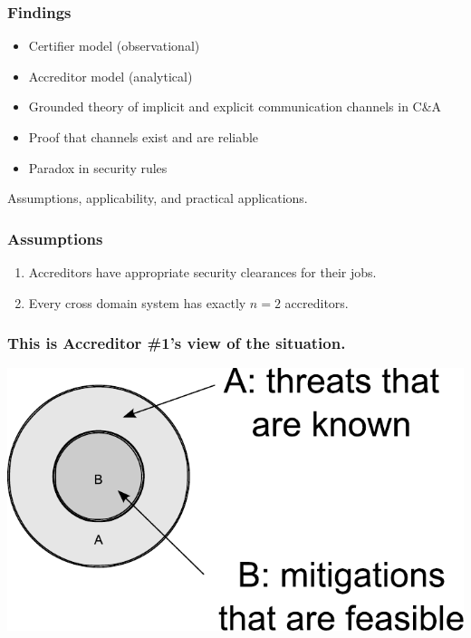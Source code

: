 \documentclass{beamer}
\begin{document}

\begin{frame}
	\frametitle{Findings}
	\begin{itemize}
		\item Certifier model (observational)
		\item Accreditor model (analytical)
		\item Grounded theory of implicit and explicit communication channels in C\&A
		\item Proof that channels exist and are reliable
		\item Paradox in security rules
	\end{itemize}
	\vfill
	Assumptions, applicability, and practical applications.
\end{frame}

\begin{frame}
	\frametitle{Assumptions}
	\begin{enumerate}
		\item Accreditors have appropriate security clearances for their jobs.
		\item Every cross domain system has exactly $n=2$ accreditors.
	\end{enumerate}
\end{frame}

\begin{frame}
	\frametitle{This is Accreditor \#1's view of the situation.}
	\begin{center}
		\includegraphics[width=\textwidth]{venn_diagrams_for_slides_1.pdf}
	\end{center}
\end{frame}
\end{document}
